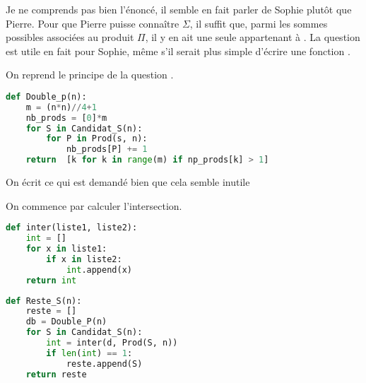 \begin{Exercise}

Je ne comprends pas bien l'énoncé, il semble en fait parler de Sophie plutôt que Pierre. Pour que Pierre puisse connaître $\Sigma$, il suffit que, parmi les sommes possibles associées au produit $\Pi$, il y en ait une seule appartenant à . La question est utile en fait pour Sophie, même s'il serait plus simple d'écrire une fonction . 


On reprend le principe de la question .
\begin{lstlisting}[language=python]
def Double_p(n):
    m = (n*n)//4+1
    nb_prods = [0]*m
    for S in Candidat_S(n):
        for P in Prod(s, n):
            nb_prods[P] += 1
    return  [k for k in range(m) if np_prods[k] > 1]
\end{lstlisting}
\end{Exercise}
\begin{Exercise}
On écrit ce qui est demandé bien que cela semble inutile

On commence par calculer l'intersection.

\begin{lstlisting}[language=python]
def inter(liste1, liste2):
    int = []
    for x in liste1:
        if x in liste2:
            int.append(x)
    return int
\end{lstlisting}

\newpage

\begin{lstlisting}[language=python]
def Reste_S(n):
    reste = []
    db = Double_P(n)
    for S in Candidat_S(n):
        int = inter(d, Prod(S, n))
        if len(int) == 1:
            reste.append(S)
    return reste
\end{lstlisting}
\end{Exercise}
